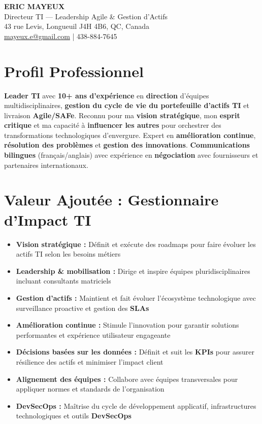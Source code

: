 \documentclass[11pt,a4paper]{article}
\newcommand{\highlight}[1]{\textcolor{primaryblue}{\textbf{#1}}}
\newcommand{\keypoint}[1]{\textbf{#1}}
\begin{document}
\begin{center}
    {\LARGE \textbf{ERIC MAYEUX}}\\
    \vspace{2pt}
    {\normalsize Directeur TI — Leadership Agile \& Gestion d'Actifs}\\
    \vspace{3pt}
    43 rue Levis, Longueuil J4H 4B6, QC, Canada\\
    \href{mailto:mayeux.e@gmail.com}{mayeux.e@gmail.com} | 438-884-7645
\end{center}

\vspace{6pt}

\section*{Profil Professionnel}
\noindent
\highlight{Leader TI} avec \keypoint{10+ ans d'expérience} en \highlight{direction} d'équipes multidisciplinaires, \highlight{gestion du cycle de vie du portefeuille d'actifs TI} et livraison \highlight{Agile/SAFe}. Reconnu pour ma \highlight{vision stratégique}, mon \highlight{esprit critique} et ma capacité à \highlight{influencer les autres} pour orchestrer des transformations technologiques d'envergure. Expert en \highlight{amélioration continue}, \highlight{résolution des problèmes} et \highlight{gestion des innovations}. \highlight{Communications bilingues} (français/anglais) avec expérience en \highlight{négociation} avec fournisseurs et partenaires internationaux.

\section*{Valeur Ajoutée : Gestionnaire d'Impact TI}
\begin{itemize}[leftmargin=10pt]
    \item \highlight{Vision stratégique :} Définit et exécute des roadmaps pour faire évoluer les actifs TI selon les besoins métiers
    \item \highlight{Leadership \& mobilisation :} Dirige et inspire équipes pluridisciplinaires incluant consultants matriciels
    \item \highlight{Gestion d'actifs :} Maintient et fait évoluer l'écosystème technologique avec surveillance proactive et gestion des \highlight{SLAs}
    \item \highlight{Amélioration continue :} Stimule l'innovation pour garantir solutions performantes et expérience utilisateur engageante
    \item \highlight{Décisions basées sur les données :} Définit et suit les \highlight{KPIs} pour assurer résilience des actifs et minimiser l'impact client
    \item \highlight{Alignement des équipes :} Collabore avec équipes transversales pour appliquer normes et standards de l'organisation
    \item \highlight{DevSecOps :} Maîtrise du cycle de développement applicatif, infrastructures technologiques et outils \highlight{DevSecOps}
\end{itemize}
\end{document}
